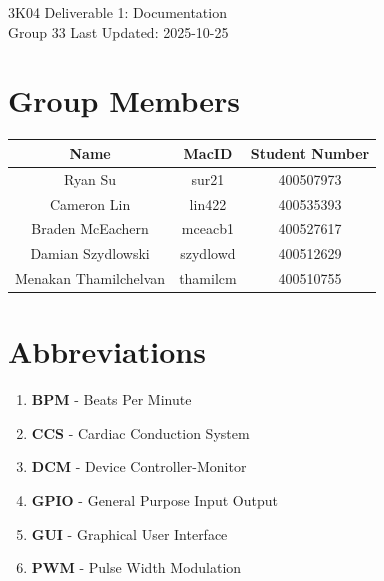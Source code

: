 \documentclass{article}
\begin{document}

\begin{titlepage}
    \begin{center}
        \vspace*{1cm}
        \Huge
        3K04 Deliverable 1: Documentation
        \vspace{1cm}\\
        \huge
        Group 33
        \normalsize
        \vfill
        Last Updated: 2025-10-25
    \end{center}
 \end{titlepage}


\newpage
\tableofcontents


\newpage
{}
\listoffigures
{}

\listoftables
{}


\clearpage
{}
\newpage
\section{Group Members}
\begin{tabular}{|c|c|c|}
    \hline
    Name        & MacID         & Student Number    \\
    \hline
    Ryan Su     & sur21         & 400507973         \\
    \hline
    Cameron Lin & lin422        & 400535393         \\
    \hline
    Braden McEachern & mceacb1  & 400527617 \\
    \hline
    Damian Szydlowski & szydlowd & 400512629 \\
    \hline
    Menakan Thamilchelvan & thamilcm & 400510755\\ 
    \hline
\end{tabular}

\newpage
\section{Abbreviations}
\begin{enumerate}[label=]
    \item \textbf{BPM} - Beats Per Minute
    \item \textbf{CCS} - Cardiac Conduction System
    \item \textbf{DCM} - Device Controller-Monitor
    \item \textbf{GPIO} - General Purpose Input Output
    \item \textbf{GUI} - Graphical User Interface
    \item \textbf{PWM} - Pulse Width Modulation
\end{enumerate}
\end{document}
